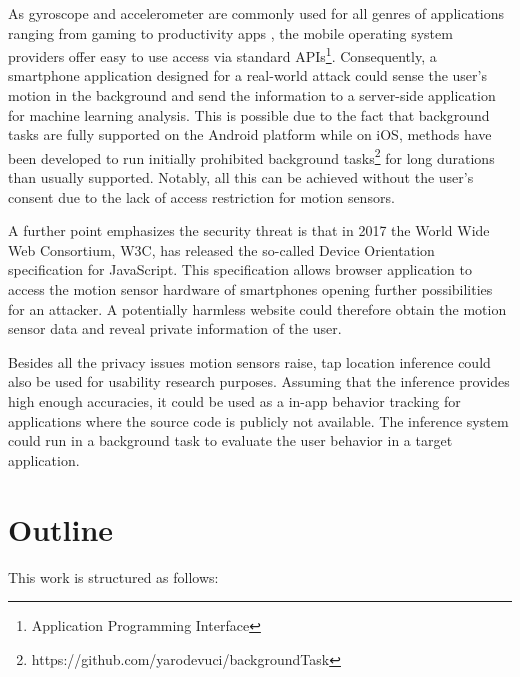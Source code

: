 As gyroscope and accelerometer are commonly used for all genres of applications ranging from gaming \cite{feijoo2012mobile} to productivity apps \cite{pylvanainen2005accelerometer}, the mobile operating system providers offer easy to use access via standard APIs\footnote{Application Programming Interface}. Consequently, a smartphone application designed for a real-world attack could sense the user's motion in the background and send the information to a server-side application for machine learning analysis. This is possible due to the fact that background tasks are fully supported on the Android platform while on iOS, methods have been developed to run initially prohibited background tasks\footnote{https://github.com/yarodevuci/backgroundTask} for long durations than usually supported. Notably, all this can be achieved without the user's consent due to the lack of access restriction for motion sensors.

A further point emphasizes the security threat is that in 2017 the World Wide Web Consortium, W3C, has released the so-called Device Orientation specification \cite{w3c} for JavaScript. This specification allows browser application to access the motion sensor hardware of smartphones opening further possibilities for an attacker. A potentially harmless website could therefore obtain the motion sensor data and reveal private information of the user.


Besides all the privacy issues motion sensors raise, tap location inference could also be used for usability research purposes. Assuming that the inference provides high enough accuracies, it could be used as a in-app behavior tracking for applications where the source code is publicly not available. The inference system could run in a background task to evaluate the user behavior in a target application.

\section{Outline}
This work is structured as follows:

